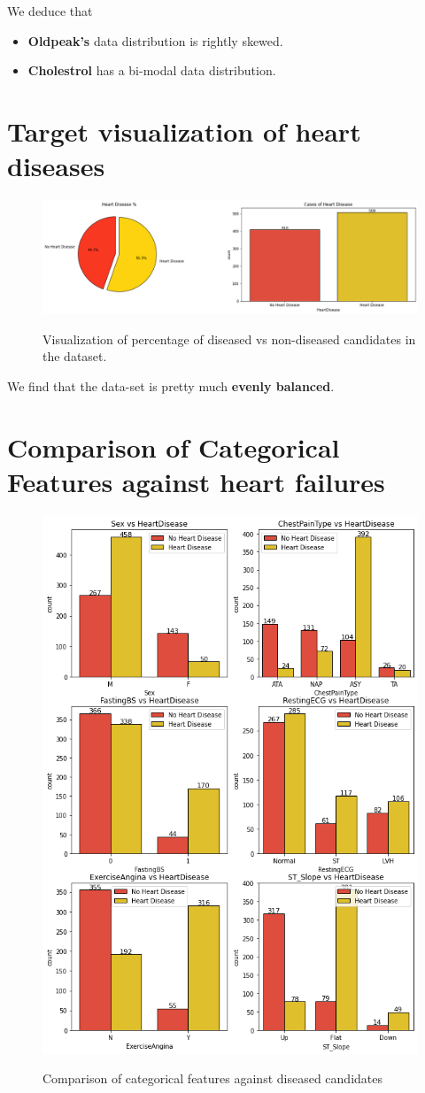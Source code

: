 We deduce that 
\begin{itemize}
    \item \textbf{Oldpeak's} data distribution is rightly skewed.
    \item \textbf{Cholestrol} has a bi-modal data distribution. 
\end{itemize}
\newpage 
\section{Target visualization of heart diseases}
\begin{figure}[!htpb]
    \centering
    \includegraphics[width=\linewidth]{Figures/Outputs/target-visualization.png}
    \label{Visulazation of target}
    \caption{Visualization of percentage of diseased vs non-diseased candidates in the dataset.}
\end{figure}
We find that the data-set is pretty much \textbf{evenly balanced}.

\section{Comparison of Categorical Features against heart failures}
\begin{figure}[!htpb]
    \centering
    \includegraphics[width=0.5\linewidth]{Figures/Outputs/cat-vs-tar.png}
    \label{Comparison between categorical features against heart failures}
    \caption{Comparison of categorical features against diseased candidates}
\end{figure}
